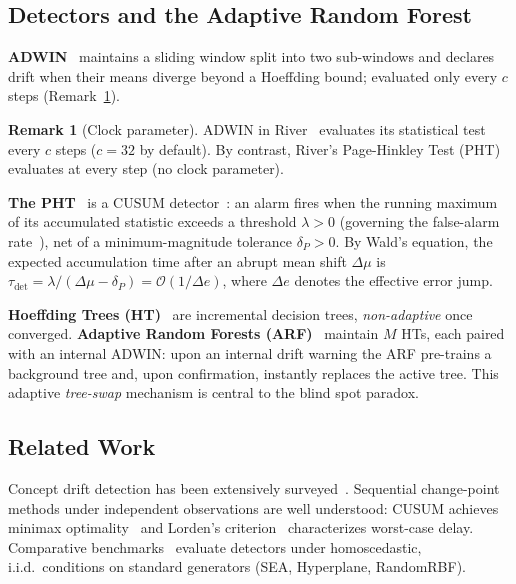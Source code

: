 \documentclass[10pt,conference]{IEEEtran}
\theoremstyle{definition}
\newtheorem{remark}[theorem]{Remark}
\begin{document}
\subsection{Detectors and the Adaptive Random Forest}\label{sec:adwin}
\textbf{ADWIN}~\cite{bifet_adwin_2007} maintains a sliding window split into two sub-windows and declares drift when their means diverge beyond a Hoeffding bound; evaluated only every $c$ steps (Remark~\ref{rem:clock}).

\begin{remark}[Clock parameter]\label{rem:clock}
  ADWIN in River~\cite{montiel_river_2021} evaluates its statistical test every $c$ steps ($c=32$ by default). By contrast, River's Page-Hinkley Test (PHT) evaluates at every step (no clock parameter).
\end{remark}

\noindent\textbf{The PHT}~\cite{page_1954} is a CUSUM detector~\cite{basseville_1993}: an alarm fires when the running maximum of its accumulated statistic exceeds a threshold $\lambda > 0$ (governing the false-alarm rate~\cite{tartakovsky_2014}), net of a minimum-magnitude tolerance $\delta_P > 0$. By Wald's equation, the expected accumulation time after an abrupt mean shift $\Delta\mu$ is $\tau_{\mathrm{det}} = \lambda / (\Delta\mu - \delta_P) = \mathcal{O}(1/\Delta e)$, where $\Delta e$ denotes the effective error jump.

\noindent\textbf{Hoeffding Trees (HT)}~\cite{gama_survey_2014} are incremental decision trees, \emph{non-adaptive} once converged. \textbf{Adaptive Random Forests (ARF)}~\cite{gomes_arf_2017} maintain $M$ HTs, each paired with an internal ADWIN: upon an internal drift warning the ARF pre-trains a background tree and, upon confirmation, instantly replaces the active tree. This adaptive \emph{tree-swap} mechanism is central to the blind spot paradox.

\subsection{Related Work}\label{sec:related}
Concept drift detection has been extensively surveyed~\cite{gama_survey_2014, lu_concept_drift_2018}.
Sequential change-point methods under independent observations are well understood: CUSUM achieves minimax optimality~\cite{moustakides_1986} and Lorden's criterion~\cite{lorden_1971} characterizes worst-case delay.
Comparative benchmarks~\cite{goncalves_2014, lukats_2025} evaluate detectors under homoscedastic, i.i.d.\ conditions on standard generators (SEA, Hyperplane, RandomRBF).
\end{document}
